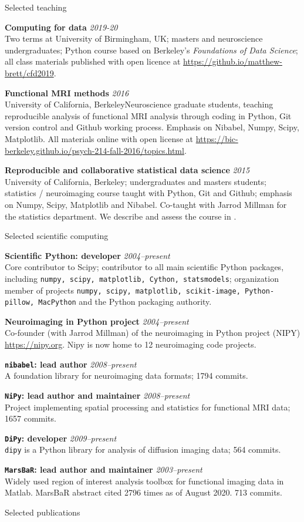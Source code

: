 \documentclass[11pt]{cv}
\newcommand{\PlaceDateNote}[3]{{\bf #1} \hfill {\em #2} \\#3}
\newcommand{\UCB}{University of California, Berkeley}
\newcommand{\UoB}{University of Birmingham, UK}
\newcommand{\Pkg}[1]{{\tt #1}}
\begin{document}
\begin{cvSection}{Selected teaching}

\PlaceDateNote{Computing for data}{2019-20}
    {Two terms at \UoB; masters and neuroscience undergraduates; Python course
    based on Berkeley's {\it Foundations of Data Science}; all class materials
    published with open licence at
    \url{https://github.io/matthew-brett/cfd2019}.}

\PlaceDateNote{Functional MRI methods}{2016}
    {\UCB Neuroscience graduate students, teaching reproducible analysis of
    functional MRI analysis through coding in Python, Git version control and
    Github working process. Emphasis on Nibabel, Numpy, Scipy, Matplotlib. All
    materials online with open license at
    \url{https://bic-berkeley.github.io/psych-214-fall-2016/topics.html}.}

\PlaceDateNote{Reproducible and collaborative statistical data science}{2015}
    {\UCB; undergraduates and masters students; statistics / neuroimaging
    course taught with Python, Git and Github; emphasis on Numpy, Scipy,
    Matplotlib and Nibabel. Co-taught with Jarrod Millman for the statistics
    department.  We describe and assess the course in
    \cite{millman2018rcsds}.}

\end{cvSection}

\begin{cvSection}{Selected scientific computing}

\PlaceDateNote{Scientific Python: developer}{2004--present}
{Core contributor to Scipy; contributor to all main scientific Python
    packages, including \Pkg{numpy, scipy, matplotlib, Cython, statsmodels};
    organization member of projects \Pkg{numpy, scipy, matplotlib,
    scikit-image, Python-pillow, MacPython} and the Python packaging
    authority.}

\PlaceDateNote{Neuroimaging in Python project}{2004--present}
{Co-founder (with Jarrod Millman) of the neuroimaging in Python project (NIPY)
    \url{https://nipy.org}.  Nipy is now home to 12 neuroimaging
    code projects.}

\PlaceDateNote{\Pkg{nibabel}: lead author}{2008--present}
    {A foundation library for neuroimaging data formats; 1794 commits.}

\PlaceDateNote{\Pkg{NiPy}: lead author and maintainer}{2008--present} {Project
    implementing spatial processing and statistics for functional MRI
    data; 1657 commits.}

\PlaceDateNote{\Pkg{DiPy}: developer}{2009--present}
    {\Pkg{dipy} is a Python library for
    analysis of diffusion imaging data; 564 commits.}

\PlaceDateNote{\Pkg{MarsBaR}: lead author and maintainer}{2003--present}
    {Widely used region of interest analysis toolbox for functional imaging
    data in Matlab.  MarsBaR abstract cited 2796 times as of August 2020. 713
    commits.}

\end{cvSection}

\begin{cvSection}{Selected publications}

\nocite{virtanen2020scipy,
    millman2018rcsds,
    garyfallidis2014dipy,
    Poline2012,
    Poldrack2008,
    Millman2007,
    Brett2007,
    Saxe2006,
    Nichols2005,
    Brett2002}

\printbibliography[heading=none]

\end{cvSection}
\end{document}
